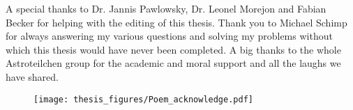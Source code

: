 A special thanks to Dr. Jannis Pawlowsky, Dr. Leonel Morejon and Fabian Becker for helping with the editing of this thesis. Thank you to Michael Schimp for always answering my various questions and solving my problems without which this thesis would have never been completed. A big thanks to the whole Astroteilchen group for the academic and moral support and all the laughs we have shared. 

\begin{figure}[h!]
    \centering
    \texttt{[image: thesis\_figures/Poem\_acknowledge.pdf]}
    \caption*{}
  \end{figure}

